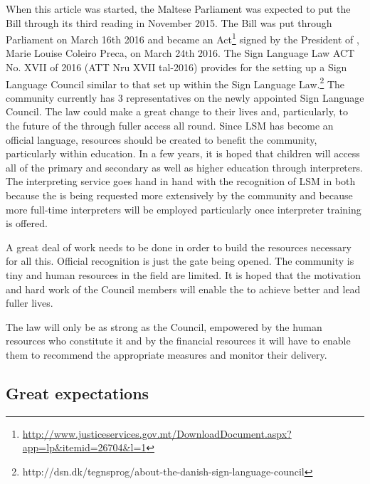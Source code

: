 \documentclass[output=paper]{langsci/langscibook}
\begin{document}
When this article was started, the Maltese Parliament was expected to
put the  Bill through its third reading in
November 2015.  The Bill was put through Parliament on March
16th 2016 and became an 
Act\footnote{\url{http://www.justiceservices.gov.mt/DownloadDocument.aspx?app=lp&itemid=26704&l=1}} signed by the President of , Marie
Louise Coleiro Preca, on March 24th 2016.  The Sign Language Law ACT
No. XVII of 2016 (ATT Nru XVII tal-2016) provides for the setting up a
Sign Language Council similar to that set up within the  Sign
Language
Law.\footnote{http://dsn.dk/tegnsprog/about-the-danish-sign-language-council}
The  community currently has 3 representatives on the newly
appointed Sign Language Council. The law could make a great change to
their lives and, particularly, to the future of the  through
fuller access all round. Since LSM has become an official language, resources should be created to benefit the  community, particularly
within education.  In a few years, it is hoped that  children will
access all of the primary and secondary  as well as
higher education through  interpreters.  The interpreting
service goes hand in hand with the recognition of LSM in  both
because the  is being requested more extensively
by the  community and because more full-time interpreters will be
employed particularly once  interpreter training is
offered.

A great deal of work needs to be done in order to build the resources
necessary for all this.  Official recognition is just the gate being
opened.  The community is tiny and human resources in the field are
limited.  It is hoped that the motivation and hard work of the Council
members will enable the  to achieve better and lead fuller lives.

The law will only be as strong as the Council, empowered by the human
resources who constitute it and by the financial resources it will
have to enable them to recommend the appropriate measures and monitor
their delivery.

\subsection{Great expectations}
\end{document}

